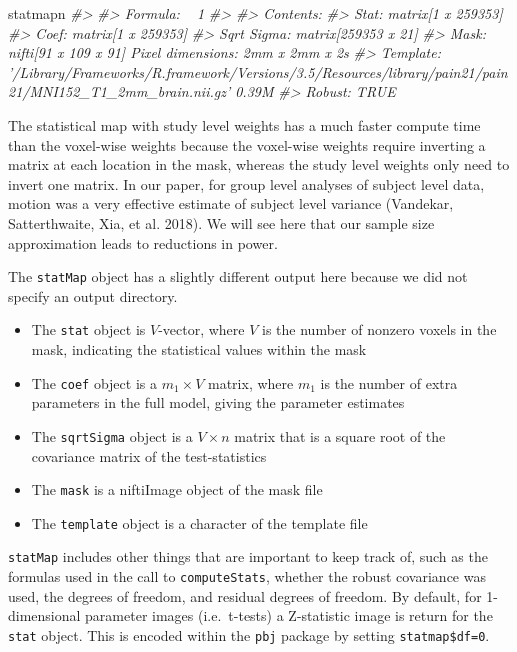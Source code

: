 \documentclass[]{article}
\newenvironment{Shaded}{\begin{snugshade}}{\end{snugshade}}
\newcommand{\CommentTok}[1]{\textcolor[rgb]{0.56,0.35,0.01}{\textit{#1}}}
\newcommand{\NormalTok}[1]{#1}
\providecommand{\tightlist}{%
  \setlength{\itemsep}{0pt}\setlength{\parskip}{0pt}}
\begin{document}
\begin{Shaded}
\begin{Highlighting}[]
\NormalTok{statmapn}
\CommentTok{#> }
\CommentTok{#> Formula: ~ 1}
\CommentTok{#> }
\CommentTok{#> Contents:}
\CommentTok{#>   Stat:       matrix[1 x 259353]}
\CommentTok{#>   Coef:       matrix[1 x 259353]}
\CommentTok{#>   Sqrt Sigma: matrix[259353 x 21]}
\CommentTok{#>   Mask:       nifti[91 x 109 x 91] Pixel dimensions: 2mm x 2mm x 2s}
\CommentTok{#>   Template:   '/Library/Frameworks/R.framework/Versions/3.5/Resources/library/pain21/pain21/MNI152_T1_2mm_brain.nii.gz' 0.39M}
\CommentTok{#>   Robust:     TRUE}
\end{Highlighting}
\end{Shaded}

The statistical map with study level weights has a much faster compute
time than the voxel-wise weights because the voxel-wise weights require
inverting a matrix at each location in the mask, whereas the study level
weights only need to invert one matrix. In our paper, for group level
analyses of subject level data, motion was a very effective estimate of
subject level variance (Vandekar, Satterthwaite, Xia, et al. 2018). We
will see here that our sample size approximation leads to reductions in
power.

The \texttt{statMap} object has a slightly different output here because
we did not specify an output directory.

\begin{itemize}
\tightlist
\item
  The \texttt{stat} object is \(V\)-vector, where \(V\) is the number of
  nonzero voxels in the mask, indicating the statistical values within
  the mask
\item
  The \texttt{coef} object is a \(m_1 \times V\) matrix, where \(m_1\)
  is the number of extra parameters in the full model, giving the
  parameter estimates
\item
  The \texttt{sqrtSigma} object is a \(V \times n\) matrix that is a
  square root of the covariance matrix of the test-statistics
\item
  The \texttt{mask} is a niftiImage object of the mask file
\item
  The \texttt{template} object is a character of the template file
\end{itemize}

\texttt{statMap} includes other things that are important to keep track
of, such as the formulas used in the call to \texttt{computeStats},
whether the robust covariance was used, the degrees of freedom, and
residual degrees of freedom. By default, for 1-dimensional parameter
images (i.e.~t-tests) a Z-statistic image is return for the
\texttt{stat} object. This is encoded within the \texttt{pbj} package by
setting \texttt{statmap\$df=0}.
\end{document}
